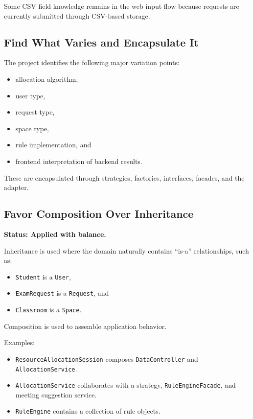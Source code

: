 \documentclass[12pt,a4paper]{article}
\begin{document}
Some CSV field knowledge remains in the web input flow because requests are
currently submitted through CSV-based storage.

\subsection{Find What Varies and Encapsulate It}

The project identifies the following major variation points:

\begin{itemize}
    \item allocation algorithm,
    \item user type,
    \item request type,
    \item space type,
    \item rule implementation, and
    \item frontend interpretation of backend results.
\end{itemize}

These are encapsulated through strategies, factories, interfaces, facades, and
the adapter.

\subsection{Favor Composition Over Inheritance}

\textbf{Status: Applied with balance.}

Inheritance is used where the domain naturally contains ``is-a'' relationships,
such as:

\begin{itemize}
    \item \texttt{Student} is a \texttt{User},
    \item \texttt{ExamRequest} is a \texttt{Request}, and
    \item \texttt{Classroom} is a \texttt{Space}.
\end{itemize}

Composition is used to assemble application behavior.

Examples:

\begin{itemize}
    \item \texttt{ResourceAllocationSession} composes
    \texttt{DataController} and \texttt{AllocationService}.
    \item \texttt{AllocationService} collaborates with a strategy,
    \texttt{RuleEngineFacade}, and meeting suggestion service.
    \item \texttt{RuleEngine} contains a collection of rule objects.
\end{itemize}
\end{document}
